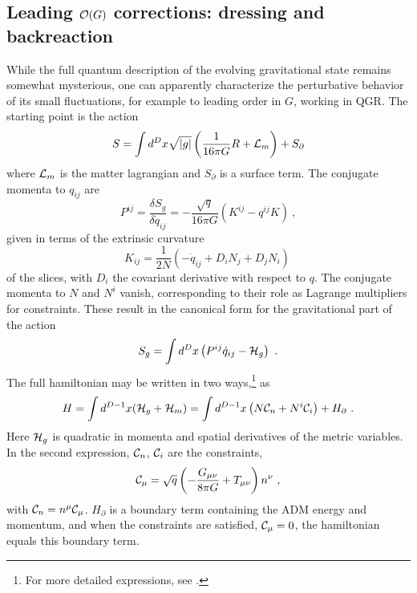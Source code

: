 \documentclass[11pt]{article}
\numberwithin{equation}{section}
\newcommand{\calC}{{\cal C}}
\newcommand{\calo}{{\cal O}}
\newcommand{\calh}{{\cal H}}
\newcommand{\call}{{\cal L}}
\newcommand{\beq}{\begin{equation}}
\newcommand{\eeq}{\end{equation}}
\begin{document}
\subsection{Leading $\calo(G)$ corrections: dressing and backreaction}

While the full quantum description of the evolving gravitational state remains somewhat mysterious, one can apparently characterize the perturbative behavior of its small fluctuations, for example to leading order in $G$, working in QGR.  The starting point is the action
\beq\label{gravaction}
S=\int d^Dx \sqrt{|g|} \left( \frac{1}{16\pi G} R + \call_m\right) + S_\partial
\eeq
where $\call_m$ is the matter lagrangian and $S_\partial$ is a surface term.  
The conjugate momenta to $q_{ij}$ are
\beq
P^{ij}=  \frac{\delta S_g}{\delta \dot q_{ij}} = -\frac{\sqrt q}{16\pi G}\left(K^{ij}- q^{ij} K\right)\ ,
\eeq
given in terms of the extrinsic curvature
\beq\label{excu}
K_{ij}= \frac{1}{2N}\left(-\dot q_{ij} + D_iN_j + D_jN_i\right)\ 
\eeq
of the slices, with $D_i$ the covariant derivative with respect to $q$.  The conjugate momenta to $N$ and $N^i$ vanish, corresponding to their role as Lagrange multipliers for constraints.  These result in the canonical form for the gravitational part of the action
\beq\label{CGact}
S_g = \int d^D x \left( P^{ij}  \dot q_{ij} -  \calh_g\right)\ .
\eeq
The full hamiltonian may be written in two ways,\footnote{For more detailed expressions, see \cite{GiPe2}.} as
\beq\label{Hreln}
H = \int d^{D-1}x (\calh_g+ \calh_m) =  \int d^{D-1}x \left(N \calC_n + N^i \calC_i\right) + H_\partial\ .
\eeq
Here $\calh_g$ is quadratic in momenta and spatial derivatives of the metric variables.  In the second expression, $\calC_n$, $\calC_i$ are the constraints, 
\beq
\calC_\mu =\sqrt q \left( -\frac{G_{\mu\nu}}{8\pi G} + T_{\mu\nu} \right) n^\nu\ ,
\eeq 
with $\calC_n=n^\mu \calC_\mu$.   $H_\partial$ is a boundary term containing the ADM energy and momentum, and when the constraints are satisfied, $\calC_\mu=0$, the hamiltonian equals this boundary term.
\end{document}
